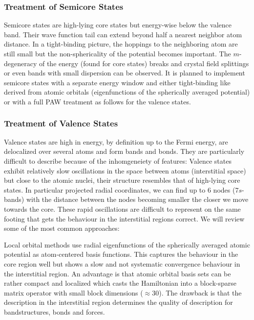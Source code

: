 \documentclass[oribibl]{llncs}
\begin{document}
\subsubsection{Treatment of Semicore States}
Semicore states are high-lying core states
but energy-wise below the valence band.
Their wave function tail can extend beyond half a nearest neighbor atom distance.
In a tight-binding picture, the hoppings to the neighboring atom are still small
but the non-sphericality of the potential becomes important.
The $m$-degeneracy of the energy (found for core states) breaks 
and crystal field splittings or even bands with small dispersion can be observed.
It is planned to implement semicore states with a separate energy window
and either tight-binding like derived from atomic orbitals 
(eigenfunctions of the spherically averaged potential) 
or with a full \ac{PAW} treatment as follows for the valence states.

\subsubsection{Treatment of Valence States}
Valence states are high in energy, by definition up to the Fermi
energy, are delocalized over several atoms and form bands and bonds.
They are particularly difficult to describe because of the 
inhomgeneiety of features:
Valence states exhibit relatively slow oscillations 
in the space between atoms (interstitial space) but close to the atomic nuclei,
their structure resembles that of high-lying core states.
In particular projected radial coordinates, we can find up to $6$ nodes
(7$s$-bands) with the distance between the nodes becoming smaller
the closer we move towards the core.
These rapid oscillations are difficult to represent
on the same footing that gets the behaviour in the interstitial regions correct. 
We will review some of the most common approaches:

Local orbital methods use radial eigenfunctions 
of the spherically averaged atomic potential as atom-centered basis functions.
This captures the behaviour in the core region well
but shows a slow and not systematic convergence behaviour in the interstitial region. 
An advantage is that atomic orbital basis sets can be rather compact
and localized which casts the Hamiltonian into a block-sparse matrix operator with small block dimensions ($\approx 30$).
The drawback is that the description in the interstitial region determines the
quality of description for bandstructures, bonds and forces.
\end{document}
